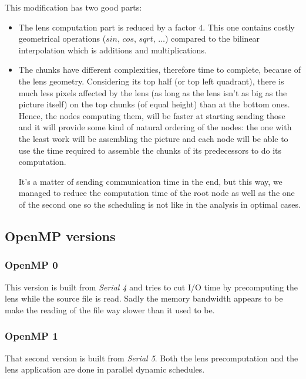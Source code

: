 \documentclass[10pt,a4paper]{article}
\begin{document}
This modification has two good parts:

\begin{itemize}
    \item The lens computation part is reduced by a factor $4$. This one
    contains costly geometrical operations ($sin$, $cos$, $sqrt$, $\ldots$)
    compared to the bilinear interpolation which is additions and
    multiplications.

    \item The chunks have different complexities, therefore time to complete,
    because of the lens geometry. Considering its top half (or top left
    quadrant), there is much less pixels affected by the lens (as long as the
    lens isn't as big as the picture itself) on the top chunks (of equal
    height) than at the bottom ones. Hence, the nodes computing them, will be
    faster at starting sending those and it will provide some kind of natural
    ordering of the nodes: the one with the least work will be assembling the
    picture and each node will be able to use the time required to assemble
    the chunks of its predecessors to do its computation.

    It's a matter of sending communication time in the end, but this way, we
    managed to reduce the computation time of the root node as well as the
    one of the second one so the scheduling is not like in the analysis in
    optimal cases.
\end{itemize}

\subsection{OpenMP versions}

\subsubsection{OpenMP 0}

This version is built from \emph{Serial 4} and tries to cut I/O time by
precomputing the lens while the source file is read. Sadly the memory bandwidth
appears to be make the reading of the file way slower than it used to be.

\subsubsection{OpenMP 1}

That second version is built from \emph{Serial 5}. Both the lens precomputation
and the lens application are done in parallel dynamic schedules.
\end{document}
